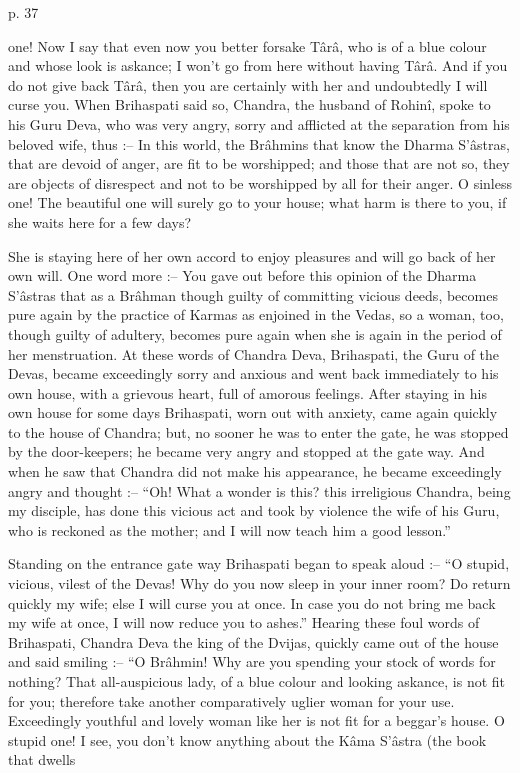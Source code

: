  

p. 37

 

one! Now I say that even now you better forsake Târâ, who is of a blue colour and whose look is askance; I won't go from here without having Târâ. And if you do not give back Târâ, then you are certainly with her and undoubtedly I will curse you. When Brihaspati said so, Chandra, the husband of Rohinî, spoke to his Guru Deva, who was very angry, sorry and afflicted at the separation from his beloved wife, thus :-- In this world, the Brâhmins that know the Dharma S'âstras, that are devoid of anger, are fit to be worshipped; and those that are not so, they are objects of disrespect and not to be worshipped by all for their anger. O sinless one! The beautiful one will surely go to your house; what harm is there to you, if she waits here for a few days?

 

She is staying here of her own accord to enjoy pleasures and will go back of her own will. One word more :-- You gave out before this opinion of the Dharma S'âstras that as a Brâhman though guilty of committing vicious deeds, becomes pure again by the practice of Karmas as enjoined in the Vedas, so a woman, too, though guilty of adultery, becomes pure again when she is again in the period of her menstruation. At these words of Chandra Deva, Brihaspati, the Guru of the Devas, became exceedingly sorry and anxious and went back immediately to his own house, with a grievous heart, full of amorous feelings. After staying in his own house for some days Brihaspati, worn out with anxiety, came again quickly to the house of Chandra; but, no sooner he was to enter the gate, he was stopped by the door-keepers; he became very angry and stopped at the gate way. And when he saw that Chandra did not make his appearance, he became exceedingly angry and thought :--  “Oh! What a wonder is this? this irreligious Chandra, being my disciple, has done this vicious act and took by violence the wife of his Guru, who is reckoned as the mother; and I will now teach him a good lesson.”

 

Standing on the entrance gate way Brihaspati began to speak aloud :-- “O stupid, vicious, vilest of the Devas! Why do you now sleep in your inner room? Do return quickly my wife; else I will curse you at once. In case you do not bring me back my wife at once, I will now reduce you to ashes.” Hearing these foul words of Brihaspati, Chandra Deva the king of the Dvijas, quickly came out of the house and said smiling :-- “O Brâhmin! Why are you spending your stock of words for nothing? That all-auspicious lady, of a blue colour and looking askance, is not fit for you; therefore take another comparatively uglier woman for your use. Exceedingly youthful and lovely woman like her is not fit for a beggar's house. O stupid one! I see, you don't know anything about the Kâma S'âstra (the book that dwells

